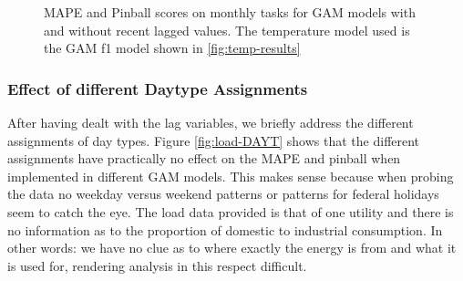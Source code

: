 \documentclass[conference]{IEEEtran}
\begin{document}
\begin{figure}[!ht]
\begin{subfigure}[b]{\linewidth}
\label{subfig:DLAG2}
\end{subfigure}
\caption{MAPE and Pinball scores on monthly tasks for GAM models with and without recent lagged values. The temperature model used is the GAM f1 model shown in \ref{fig:temp-results}}
\label{fig:load-DLAG}
\end{figure}

\subsubsection{Effect of different Daytype Assignments}
After having dealt with the lag variables, we briefly address the different assignments of day types. Figure \ref{fig:load-DAYT} shows that the different assignments have practically no effect on the MAPE and pinball when implemented in different GAM models. This makes sense because when probing the data no weekday versus weekend patterns or patterns for federal holidays seem to catch the eye. The load data provided is that of one utility and there is no information as to the proportion of domestic to industrial consumption. In other words: we have no clue as to where exactly the energy is from and what it is used for, rendering analysis in this respect difficult. 
\end{document}
